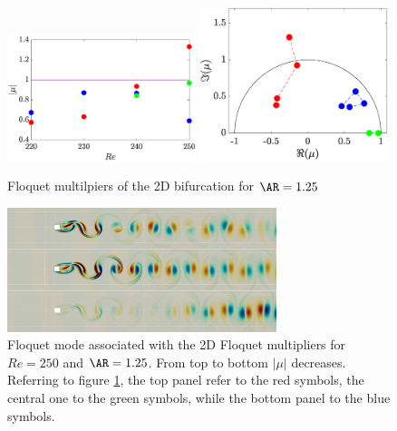 \begin{figure}
  \centering
  \includegraphics[width=0.49\textwidth]{./fig/AR1s/mu_Re_Ar1p25_2D.eps}
  \includegraphics[width=0.49\textwidth]{./fig/AR1s/mu_Ar1p25_2D.eps}  
  \caption{Floquet multilpiers of the 2D bifurcation for $\AR=1.25$}
  \label{fig:bif2D_AR1p25}
\end{figure}

\begin{figure}
  \centering
  \includegraphics[width=0.7\textwidth]{./fig/AR1p25/Mode_omegar_2D_Re250.png}
  \caption{Floquet mode associated with the 2D Floquet multipliers for $Re=250$ and $\AR=1.25$. From top to bottom $|\mu|$ decreases. Referring to figure \ref{fig:bif2D_AR1p25}, the top panel refer to the red symbols, the central one to the green symbols, while the bottom panel to the blue symbols.}
  \label{fig:mod2DAR1p25}
\end{figure}

